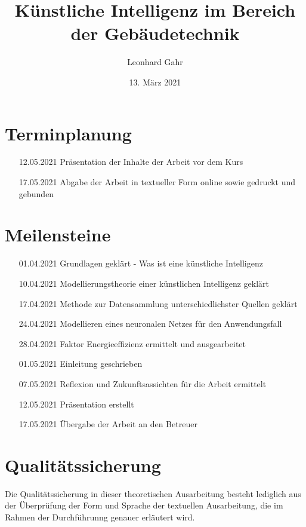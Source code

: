\documentclass[
	ngerman,
	12pt, %
]{pm}
\title{Künstliche Intelligenz im Bereich der Gebäudetechnik}
\author{Leonhard Gahr} %
\date{13. März 2021} %
\institute{\texttt{[image: ../img/sie-logo.png]}\hfill\texttt{[image: ../img/dhbw-logo]}} %
\begin{document}
\maketitle %


\section*{\large Terminplanung}
\begin{enumerate}
	\item [12.05.2021] \quad Präsentation der Inhalte der Arbeit vor dem Kurs
	\item [17.05.2021] \quad Abgabe der Arbeit in textueller Form online sowie gedruckt und gebunden
\end{enumerate}


\section*{\large Meilensteine}
\begin{enumerate}
	\item [01.04.2021] \quad Grundlagen geklärt - Was ist eine künstliche Intelligenz
	\item [10.04.2021] \quad Modellierungstheorie einer künstlichen Intelligenz geklärt
	\item [17.04.2021] \quad Methode zur Datensammlung unterschiedlichster Quellen geklärt
	\item [24.04.2021] \quad Modellieren eines neuronalen Netzes für den Anwendungsfall
	\item [28.04.2021] \quad Faktor Energieeffizienz ermittelt und ausgearbeitet
	\item [01.05.2021] \quad Einleitung geschrieben
	\item [07.05.2021] \quad Reflexion und Zukunftsassichten für die Arbeit ermittelt
	\item [12.05.2021] \quad Präsentation erstellt
	\item [17.05.2021] \quad Übergabe der Arbeit an den Betreuer
\end{enumerate}

\section*{\large Qualitätssicherung}
Die Qualitätssicherung in dieser theoretischen Ausarbeitung besteht lediglich aus der Überprüfung der Form und Sprache der textuellen Ausarbeitung, die im Rahmen der Durchführunng genauer erläutert wird.
\end{document}
